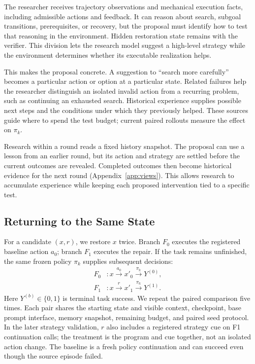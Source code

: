 The researcher receives trajectory observations and mechanical execution
facts, including admissible actions and feedback. It can reason about
search, subgoal transitions, prerequisites, or recovery, but the proposal
must identify how to test that reasoning in the environment. Hidden
restoration state remains with the verifier. This division lets the
research model suggest a high-level strategy while the environment
determines whether its executable realization helps.

This makes the proposal concrete. A suggestion to ``search more carefully''
becomes a particular action or option at a particular state. Related failures
help the researcher distinguish an isolated invalid action from a recurring
problem, such as continuing an exhausted search. Historical experience
supplies possible next steps and the conditions under which they previously
helped. These sources guide where to spend the test budget; current paired
rollouts measure the effect on $\pi_k$.

Research within a round reads a fixed history snapshot. The proposal can
use a lesson from an earlier round, but its action and strategy are settled
before the current outcomes are revealed. Completed outcomes then become
historical evidence for the next round (Appendix~\ref{app:views}). This
allows research to accumulate experience while keeping each proposed
intervention tied to a specific test.

\subsection{Returning to the Same State}
\label{sec:verification}
For a candidate $(x,r)$, we restore $x$ twice. Branch $F_0$ executes the
registered baseline action $a_0$; branch $F_1$ executes the repair. If the task remains unfinished, the same frozen policy $\pi_k$ supplies
subsequent decisions:
\begin{equation}
\begin{aligned}
F_0 &: x\xrightarrow{a_0}x'_0\xrightarrow{\pi_k}Y^{(0)},\\
F_1 &: x\xrightarrow{r}x'_1\xrightarrow{\pi_k}Y^{(1)}.
\end{aligned}
\label{eq:branches}
\end{equation}
Here $Y^{(b)}\in\{0,1\}$ is terminal task success. We repeat the paired
comparison five times. Each pair shares the starting state and visible
context, checkpoint, base prompt interface, memory snapshot, remaining budget, and
paired seed protocol. In the later strategy validation, $r$ also includes
a registered strategy cue on F1 continuation calls; the treatment is the
program and cue together, not an isolated action change. The baseline is a fresh policy continuation and can succeed
even though the source episode failed.


